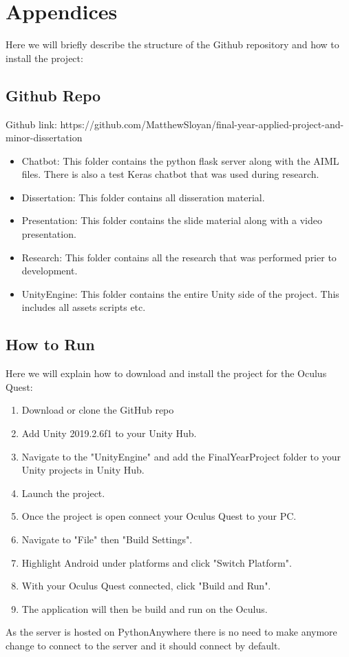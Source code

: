 \chapter{Appendices}


Here we will briefly describe the structure of the Github repository and how to install the project:

\section{Github Repo}
Github link: https://github.com/MatthewSloyan/final-year-applied-project-and-minor-dissertation
\begin{itemize}
    \item Chatbot: This folder contains the python flask server along with the AIML files. There is also a test Keras chatbot that was used during research.
    \item Dissertation: This folder contains all disseration material.
    \item Presentation: This folder contains the slide material along with a video presentation.
    \item Research: This folder contains all the research that was performed prier to development.
    \item UnityEngine: This folder contains the entire Unity side of the project. This includes all assets scripts etc.
\end{itemize}
\newpage
\section{How to Run}
Here we will explain how to download and install the project for the Oculus Quest:
\begin{enumerate}
    \item Download or clone the GitHub repo
    \item Add Unity 2019.2.6f1 to your Unity Hub. 
    \item Navigate to the "UnityEngine" and add the FinalYearProject folder to your Unity projects in Unity Hub.
    \item Launch the project.
    \item Once the project is open connect your Oculus Quest to your PC.
    \item Navigate to "File" then "Build Settings".
    \item Highlight Android under platforms and click "Switch Platform".
    \item With your Oculus Quest connected, click "Build and Run".
    \item The application will then be build and run on the Oculus.
\end{enumerate}

As the server is hosted on PythonAnywhere there is no need to make anymore change to connect to the server and it should connect by default.
